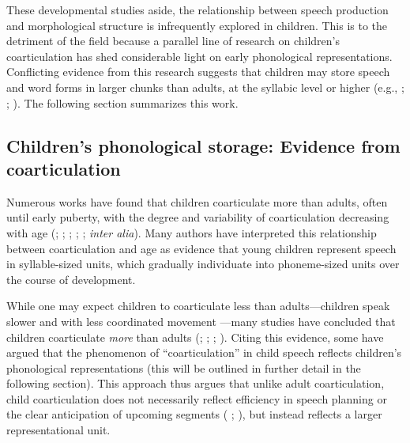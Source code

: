 \documentclass[a4paper,man,floatsintext,natbib,donotrepeattitle, apacite]{apa6}
\begin{document}
These developmental studies aside, the relationship between speech production and morphological structure is infrequently explored in children. This is to the detriment of the field because a parallel line of research on children's coarticulation has shed considerable light on early phonological representations. Conflicting evidence from this research suggests that children may store speech and word forms in larger chunks than adults, at the syllabic level or higher (e.g., \citealt{nittrouerEmergencePhoneticSegments1989};  \citealt{noirayBackFutureNonlinear2019}; \citealt{zharkovaCoarticulationIndicatorSpeech2011}). The following section summarizes this work.

\subsection{Children's phonological storage: Evidence from coarticulation}\label{child-coartic}

Numerous works have found that children coarticulate more than adults, often until early puberty, with the degree and variability of coarticulation decreasing with age (\citealt{goodellAcousticEvidenceDevelopment1992}; \citealt{nittrouerEmergencePhoneticSegments1989}; \citealt{nittrouerHowChildrenLearn1996}; \citealt{noirayBackFutureNonlinear2019};  \citealt{zharkovaSpatialTemporalLingual2014}; \citealt{zharkovaDynamicsVoicelessSibilant2018} \textit{inter alia}). Many authors have interpreted this relationship between coarticulation and age as evidence that young children represent speech in syllable-sized units, which gradually individuate into phoneme-sized units over the course of development. 

While one may expect children to coarticulate less than adults---children speak slower and with less coordinated movement \citep{smithRelationshipsDurationTemporal1992}---many studies have concluded that children coarticulate \textit{more} than adults (\citealt{goodellAcousticEvidenceDevelopment1992}; \citealt{nittrouerEmergencePhoneticSegments1989}; \citealt{nittrouerHowChildrenLearn1996};  \citealt{zharkovaCoarticulationIndicatorSpeech2011}). Citing this evidence, some have argued that the phenomenon of ``coarticulation'' in child speech reflects children's phonological representations (this will be outlined in further detail in the following section). This approach thus argues that unlike adult coarticulation, child coarticulation does not necessarily reflect efficiency in speech planning or the clear anticipation of upcoming segments ( \citealt{bradlowConfluentTalkerListeneroriented2002}; \citealt{whalenCoarticulationLargelyPlanned1990}), but instead reflects a larger representational unit. 
\end{document}

